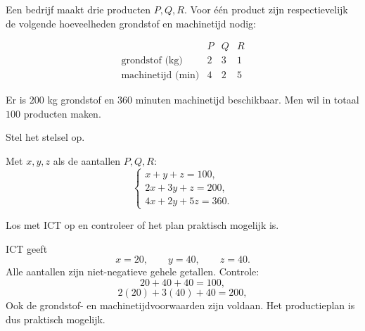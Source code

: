 \documentclass{ximera}
\begin{document}
\begin{oefening}{\oefU}

Een bedrijf maakt drie producten \(P,Q,R\). Voor één product zijn
respectievelijk de volgende hoeveelheden grondstof en machinetijd nodig:

\[
\begin{array}{c|ccc}
& P&Q&R\\ \hline
\text{grondstof (kg)}&2&3&1\\
\text{machinetijd (min)}&4&2&5
\end{array}
\]

Er is \(200\) kg grondstof en \(360\) minuten machinetijd beschikbaar.
Men wil in totaal \(100\) producten maken.

\begin{question}
Stel het stelsel op.
\begin{oplossing}
Met \(x,y,z\) als de aantallen \(P,Q,R\):
\[
\begin{cases}
x+y+z=100,\\
2x+3y+z=200,\\
4x+2y+5z=360.
\end{cases}
\]
\end{oplossing}
\end{question}

\begin{question}
Los met ICT op en controleer of het plan praktisch mogelijk is.
\begin{oplossing}
ICT geeft
\[
x=20,\qquad y=40,\qquad z=40.
\]
Alle aantallen zijn niet-negatieve gehele getallen. Controle:
\[
20+40+40=100,
\]
\[
2(20)+3(40)+40=200,
\]
Ook de grondstof- en machinetijdvoorwaarden zijn voldaan. Het productieplan is dus praktisch mogelijk.
\end{oplossing}
\end{question}
\end{oefening}



\end{document}
